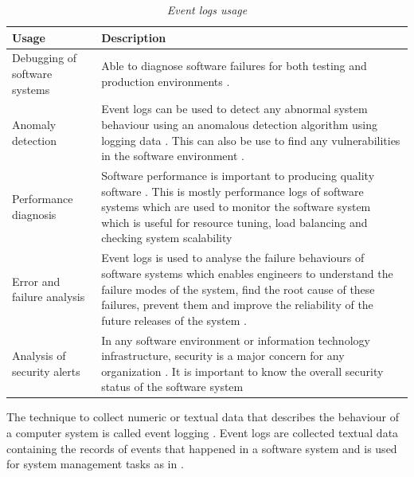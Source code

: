\begin{table}[!htb]
	\centering
	\small
	\caption[Event logs usage]
	{\textit{Event logs usage}}
	\label{tbl:CH1_EventLogsUsage}
	\begin{tabularx}{\textwidth}{|l|X|}
		\hline \textbf{Usage} & \textbf{Description} \\
		\hline Debugging of software systems & Able to diagnose software failures for both testing and production environments \cite{Rong2018a}.\\
		\hline Anomaly detection & Event logs can be used to detect any abnormal system behaviour using an anomalous detection algorithm using logging data \cite{Gurumdimma2016}.  This can also be use to find any vulnerabilities in the software environment \cite{Dwyer2013}. \\
		\hline Performance diagnosis & Software performance is important to producing quality software \cite{EvangelinGeetha2007,Baccanico2014}. This is mostly performance logs of software systems which are used to monitor the software system which is useful for resource tuning, load balancing and checking system scalability \cite{Sosnowski2014} \\ 
		\hline Error and failure analysis & Event logs is used to analyse the failure behaviours of software systems which enables engineers to understand the failure modes of the system, find the root cause of these failures, prevent them and improve the reliability of the future releases of the system \cite{Cinque2013}.\\
		\hline Analysis of security alerts & In any software environment or information technology infrastructure, security is a major concern for any organization \cite{Pathan2014, Dwyer2013}. It is important to know the overall security status of the software system \\
		\hline
	\end{tabularx}
\end{table}

The technique to collect numeric or textual data that describes the behaviour of a computer system is called event logging \cite{Pecchia2015, Baccanico2014}. Event logs are collected textual data containing the records of events that happened in a software system and is used for system management tasks as in  \cite{Rong2018a, Rong2018, Baccanico2014}.

